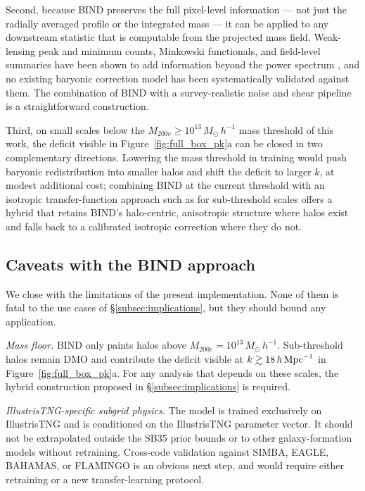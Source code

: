 \documentclass[linenumbers,trackchanges, twocolumn]{aastex701}
\begin{document}
Second, because \textsc{BIND} preserves the full pixel-level information --- not just the radially averaged profile or the integrated mass --- it can be applied to any downstream statistic that is computable from the projected mass field. Weak-lensing peak and minimum counts, Minkowski functionals, and field-level summaries have been shown to add information beyond the power spectrum \citep{Lee2023,Lee2026}, and no existing baryonic correction model has been systematically validated against them. The combination of \textsc{BIND} with a survey-realistic noise and shear pipeline is a straightforward construction.

Third, on small scales below the $M_{200c}\geq 10^{13}\,M_\odot\,h^{-1}$ mass threshold of this work, the deficit visible in Figure~\ref{fig:full_box_pk}a can be closed in two complementary directions. Lowering the mass threshold in training would push baryonic redistribution into smaller halos and shift the deficit to larger $k$, at modest additional cost; combining \textsc{BIND} at the current threshold with an isotropic transfer-function approach such as \citet{Sharma2024} for sub-threshold scales offers a hybrid that retains \textsc{BIND}'s halo-centric, anisotropic structure where halos exist and falls back to a calibrated isotropic correction where they do not.

\subsection{Caveats with the BIND approach}
\label{subsec:caveats}

We close with the limitations of the present implementation. None of them is fatal to the use cases of \S\ref{subsec:implications}, but they should bound any application.

\emph{Mass floor.} \textsc{BIND} only paints halos above $M_{200c}=10^{13}\,M_\odot\,h^{-1}$. Sub-threshold halos remain DMO and contribute the deficit visible at $k\gtrsim 18\,h\,{\rm Mpc}^{-1}$ in Figure~\ref{fig:full_box_pk}a. For any analysis that depends on these scales, the hybrid construction proposed in \S\ref{subsec:implications} is required.

\emph{IllustrisTNG-specific subgrid physics.} The model is trained exclusively on IllustrisTNG and is conditioned on the IllustrisTNG parameter vector. It should not be extrapolated outside the SB35 prior bounds or to other galaxy-formation models without retraining. Cross-code validation against SIMBA, EAGLE, BAHAMAS, or FLAMINGO is an obvious next step, and would require either retraining or a new transfer-learning protocol.
\end{document}
